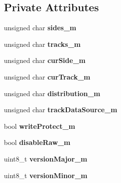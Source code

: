 \subsection*{Private Attributes}
\begin{DoxyCompactItemize}
\item 
\hypertarget{classH17Disk_a71b2b57e3f318205fcfa368046c510a6}{}unsigned char {\bfseries sides\+\_\+m}\label{classH17Disk_a71b2b57e3f318205fcfa368046c510a6}

\item 
\hypertarget{classH17Disk_ab992a0a5a5287a1d94225c5198d473e5}{}unsigned char {\bfseries tracks\+\_\+m}\label{classH17Disk_ab992a0a5a5287a1d94225c5198d473e5}

\item 
\hypertarget{classH17Disk_a3ac5f7c1b2563a8a530a3275c93161b1}{}unsigned char {\bfseries cur\+Side\+\_\+m}\label{classH17Disk_a3ac5f7c1b2563a8a530a3275c93161b1}

\item 
\hypertarget{classH17Disk_aa9e20f2d7324ad9442624cd7d4666769}{}unsigned char {\bfseries cur\+Track\+\_\+m}\label{classH17Disk_aa9e20f2d7324ad9442624cd7d4666769}

\item 
\hypertarget{classH17Disk_a117c856e648d824a935b993dce770eec}{}unsigned char {\bfseries distribution\+\_\+m}\label{classH17Disk_a117c856e648d824a935b993dce770eec}

\item 
\hypertarget{classH17Disk_a6ae4e766c5122aa5f18744f1dbf2c7c4}{}unsigned char {\bfseries track\+Data\+Source\+\_\+m}\label{classH17Disk_a6ae4e766c5122aa5f18744f1dbf2c7c4}

\item 
\hypertarget{classH17Disk_af4c5a9e09f0618ae91f6310bd445ec28}{}bool {\bfseries write\+Protect\+\_\+m}\label{classH17Disk_af4c5a9e09f0618ae91f6310bd445ec28}

\item 
\hypertarget{classH17Disk_a912a1f67ff39154b47b670ac500ec8b7}{}bool {\bfseries disable\+Raw\+\_\+m}\label{classH17Disk_a912a1f67ff39154b47b670ac500ec8b7}

\item 
\hypertarget{classH17Disk_a29e98dea922bdab941b0f427c2f578e5}{}uint8\+\_\+t {\bfseries version\+Major\+\_\+m}\label{classH17Disk_a29e98dea922bdab941b0f427c2f578e5}

\item 
\hypertarget{classH17Disk_a7bc973d0242dc1bdf94cd0a9aadb7670}{}uint8\+\_\+t {\bfseries version\+Minor\+\_\+m}\label{classH17Disk_a7bc973d0242dc1bdf94cd0a9aadb7670}


\end{DoxyCompactItemize}
